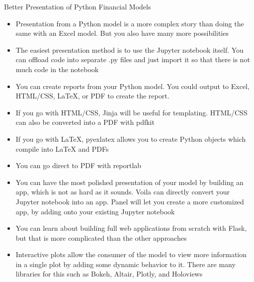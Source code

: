 \documentclass[]{article}
\begin{document}
\begin{section}{Better Presentation of Python Financial Models}
\begin{itemize}
\item Presentation from a Python model is a more complex story than doing the same with an Excel model. But you also have many more possibilities
\item The easiest presentation method is to use the Jupyter notebook itself. You can offload code into separate .py files and just import it so that there is not much code in the notebook
\item You can create reports from your Python model. You could output to Excel, HTML/CSS, LaTeX, or PDF to create the report.
\item If you go with HTML/CSS, Jinja will be useful for templating. HTML/CSS can also be converted into a PDF with pdfkit
\item If you go with LaTeX, pyexlatex allows you to create Python objects which compile into LaTeX and PDFs
\item You can go direct to PDF with reportlab
\item You can have the most polished presentation of your model by building an app, which is not as hard as it sounds. Voila can directly convert your Jupyter notebook into an app. Panel will let you create a more customized app, by adding onto your existing Jupyter notebook
\item You can learn about building full web applications from scratch with Flask, but that is more complicated than the other approaches
\item Interactive plots allow the consumer of the model to view more information in a single plot by adding some dynamic behavior to it. There are many libraries for this such as Bokeh, Altair, Plotly, and Holoviews
\end{itemize}
\end{section}
\end{document}
